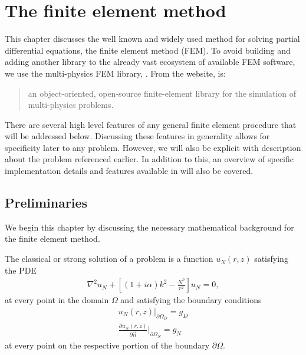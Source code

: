 \chapter{The finite element method}
\label{sec:fem}

This chapter discusses the well known and widely used method for solving partial differential equations, the finite element method (FEM).
To avoid building and adding another library to the already vast ecosystem of available FEM software, we use the multi-physics FEM library, \oomph.
From the website, \oomph is:
\begin{quote}
	an object-oriented, open-source finite-element library for the simulation of multi-physics problems. \cite{oomph}
\end{quote}
There are several high level features of any general finite element procedure that will be addressed below.
Discussing these features in generality allows for specificity later to any problem.
However, we will also be explicit with description about the problem referenced earlier.
In addition to this, an overview of specific implementation details and features available in \oomph will also be covered.






\section{Preliminaries}

\iffalse

.Problem
.Classical vs weak solution
Test functions
Sobolev space (where test functions live)
Basis/shape functions
Galerkin method -> test functions are basis functions

\fi

We begin this chapter by discussing the necessary mathematical background for the finite element method.

The classical or strong solution of a problem is a function $u_N(r,z)$ satisfying the PDE
\begin{align}
	\nabla^2 u_N + \left[ (1+i\alpha)k^2-\frac{N^2}{r^2}\right]u_N = 0,
\end{align}
at every point in the domain $\Omega$ and satisfying the boundary conditions
\begin{align}
	u_N(r,z) \vert_{\partial \Omega_D} = g_D \\
	\frac{\partial u_N(r,z)}{\partial \vec{n}} \vert_{\partial \Omega_N} = g_N
\end{align}
at every point on the respective portion of the boundary $\partial\Omega$.

